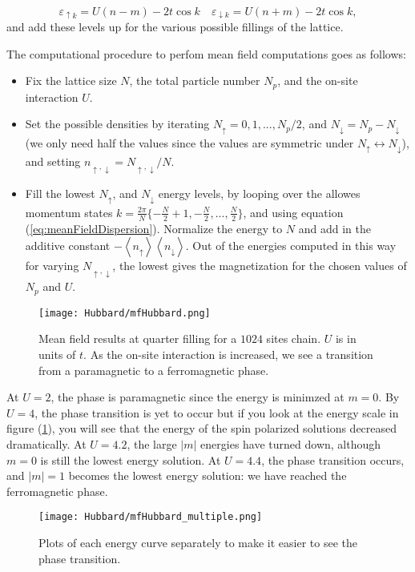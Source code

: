 \begin{equation}\label{eq:meanFieldDispersion}
\varepsilon_{\uparrow k} = U ( n - m ) - 2 t \cos k \quad \varepsilon_{\downarrow k} = U ( n + m ) - 2 t \cos k ,
\end{equation}
and add these levels up for the various possible fillings of the lattice.

The computational procedure to perfom mean field computations goes as follows:
\begin{itemize}
\item Fix the lattice size $N$, the total particle number $N_p$, and the on-site interaction $U$.
\item Set the possible densities by iterating $N_\uparrow = 0, 1, ..., N_p / 2$, and $N_\downarrow = N_p - N_\downarrow$ (we only need half the values since the values are symmetric under $ N_\uparrow \leftrightarrow N_\downarrow$), and setting $n_{\uparrow, \downarrow} = N_{\uparrow, \downarrow} / N$.
\item Fill the lowest $N_\uparrow$, and $N_\downarrow$ energy levels, by looping over the allowes momentum states $k = \frac{2\pi}{N} \{ -\frac{N}{2} + 1, -\frac{N}{2}, ..., \frac{N}{2} \}$, and using equation (\ref{eq:meanFieldDispersion}).
Normalize the energy to $N$ and add in the additive constant $- \left\langle n_\uparrow \right\rangle \left\langle n_\downarrow \right\rangle$.
Out of the energies computed in this way for varying $N_{\uparrow, \downarrow}$, the lowest gives the magnetization for the chosen values of $N_p$ and $U$.
\end{itemize}

\begin{figure}[H]
	\centering
\hspace{12mm}\texttt{[image: Hubbard/mfHubbard.png]}
	\caption[Mean field results for the \acs{1D} Hubbard model.]{Mean field results at quarter filling for a $ 1024$ sites chain.
	$U$ is in units of $t$.
	As the on-site interaction is increased, we see a transition from a paramagnetic to a ferromagnetic phase.}
	\label{fig:mft}
\end{figure}

At $U = 2$, the phase is paramagnetic since the energy is minimzed at $m = 0$. By $U = 4$, the phase transition is yet to occur but if you look at the energy scale in figure (\ref{fig:mft}), you will see that the energy of the spin polarized solutions decreased dramatically.
	At $U = 4.2$, the large $| m | $ energies have turned down, although $m = 0$ is still the lowest energy solution.
	At $U = 4.4$, the phase transition occurs, and $| m | = 1$ becomes the lowest energy solution: we have reached the ferromagnetic phase.

\begin{figure}[H]
	\centering
\texttt{[image: Hubbard/mfHubbard\_multiple.png]}
	\caption[Mean field results for the \acs{1D} Hubbard model: closing in on the phase transition.]{Plots of each energy curve separately to make it easier to see the phase transition.
	}
	\label{fig:mft_multiple}
\end{figure}